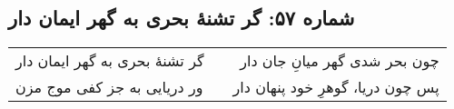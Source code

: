 \begin{center}
\section*{شماره ۵۷: گر تشنۀ بحری به گهر ایمان دار}
\label{sec:057}
\begin{longtable}{l p{0.5cm} r}
گر تشنهٔ بحری به گهر ایمان دار
&&
چون بحر شدی گهر میانِ جان دار
\\
ور دریایی به جز کفی موج مزن
&&
پس چون دریا، گوهرِ خود پنهان دار
\\
\end{longtable}
\end{center}
